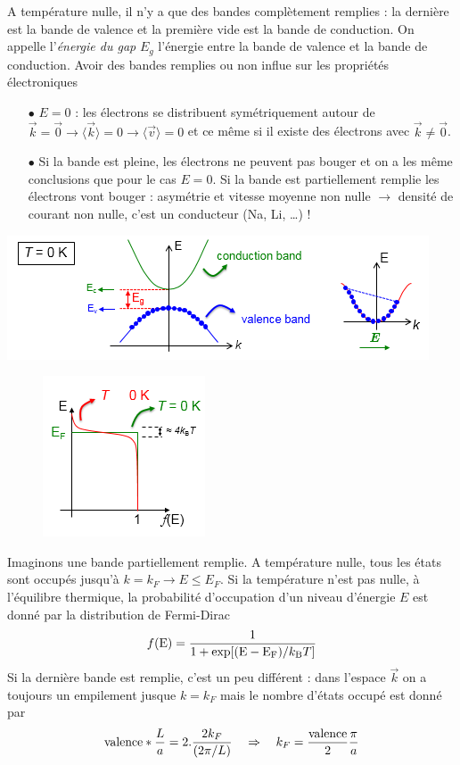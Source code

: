 	A température nulle, il n'y a que des bandes complètement remplies : la dernière est la bande
	de valence et la première vide est la bande de conduction. On appelle l'\textit{énergie du gap}
	$E_g$ l'énergie entre la bande de valence et la bande de conduction. Avoir des bandes remplies 
	ou non influe sur les propriétés électroniques
	\begin{itemize}
	\item[$\bullet$] $E=0$ : les électrons se distribuent symétriquement autour de $\vec{k}=\vec 0
	\to \langle\vec{k}\rangle = 0\to \langle \vec v\rangle=0$ et ce même si il existe des électrons
	avec $\vec{k}\neq\vec{0}$.
	\item[$\bullet$] Si la bande est pleine, les électrons ne peuvent pas bouger et on a les même 
	conclusions que pour le cas $E=0$. Si la bande est partiellement remplie les électrons vont 
	bouger : asymétrie et vitesse moyenne non nulle $\to$ densité de courant non nulle, c'est un 
	conducteur (Na, Li, \dots) !
	\end{itemize}
	\begin{center}
		\includegraphics[scale=0.8]{ch5/image7}
	\end{center}
	
	\begin{figure}
	\vspace{-5mm}
	\includegraphics[scale=0.6]{ch5/image8}
	\end{figure}
	Imaginons une bande partiellement remplie. A température nulle, tous les états sont occupés
	jusqu'à $k=k_F \to E\leq E_F$. Si la température n'est pas nulle, à l'équilibre thermique, la
	probabilité d'occupation d'un niveau d'énergie $E$ est donné par la distribution de Fermi-Dirac
	\begin{equation}
	f({\rm{E}}) = \frac{1}{{1 + \exp [({\rm{E}} - {{\rm{E}}_{\rm{F}}})/{k_{\rm{B}}}T]}}
	\end{equation}
	Si la dernière bande est remplie, c'est un peu différent : dans l'espace $\vec k$ on a toujours
	un empilement jusque $k=k_F$ mais le nombre d'états occupé est donné par
	\begin{equation}
	\text{valence}*\frac{L}{a} = 2.\frac{{2{k_F}}}{{(2\pi /L)}}\quad\Rightarrow\quad
	{k_F} = \frac{{{\rm{valence}}}}{2}\frac{\pi }{a}
	\end{equation}
	
